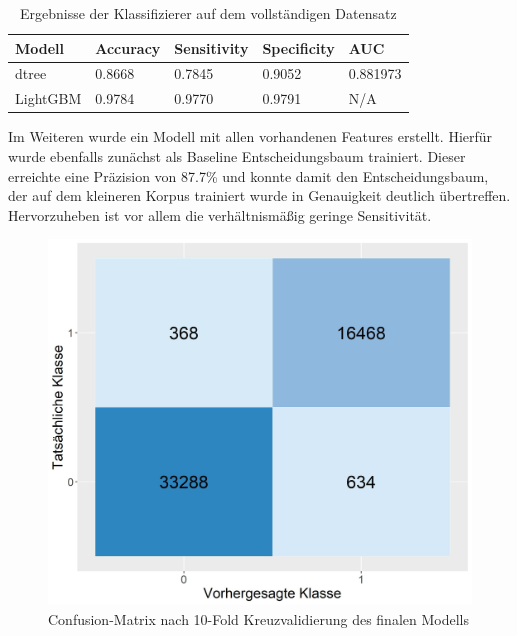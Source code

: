 \begin{table}
    \begin{center}
        \begin{tabularx}{\textwidth}{XXXXX}
            \toprule
            Modell & Accuracy & Sensitivity & Specificity & AUC\\
            \midrule
            dtree & 0.8668 & 0.7845 & 0.9052 & 0.881973 \\
            LightGBM\footnotemark & 0.9784 & 0.9770 & 0.9791 & N/A \\
            \bottomrule
        \end{tabularx}
        \caption{Ergebnisse der Klassifizierer auf dem vollständigen Datensatz}
        \label{full-model}
    \end{center}
\end{table}

Im Weiteren wurde ein Modell mit allen vorhandenen Features erstellt.
Hierfür wurde ebenfalls zunächst als Baseline Entscheidungsbaum trainiert.
Dieser erreichte eine Präzision von 87.7\% und konnte damit den Entscheidungsbaum, der auf dem kleineren Korpus trainiert wurde in Genauigkeit deutlich übertreffen.
Hervorzuheben ist vor allem die verhältnismäßig geringe Sensitivität.

\begin{figure}[ht]
    \centering
    \includegraphics[scale=0.45]{graphics/confusion_matrix.jpg}
    \caption{Confusion-Matrix nach 10-Fold Kreuzvalidierung des finalen Modells}
    \label{confusion-table}
\end{figure}

